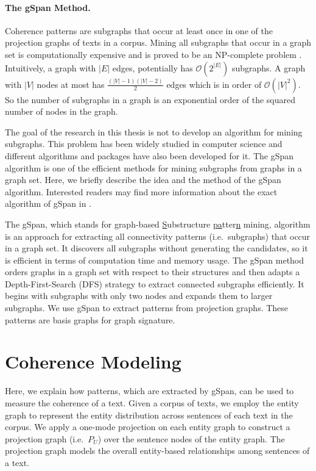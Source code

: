 \paragraph{The gSpan Method.}
%
Coherence patterns are subgraphs that occur at least once in one of the projection graphs of texts in a corpus. 
Mining all subgraphs that occur in a graph set is computationally expensive and is proved to be an NP-complete problem \cite{althaus04}. 
Intuitively, a graph with $|E|$ edges, potentially has $\mathcal{O} \left( 2^{| E |} \right)$ subgraphs.  
A graph with $| V |$ nodes at most has  $\frac{(| V |-1)(| V |-2)}{2}$ edges which is in order of $\mathcal{O} \left( | V | ^2 \right)$. 
So the number of subgraphs in a graph is an exponential order of the squared number of nodes in the graph. 

The goal of the research in this thesis is not to develop an algorithm for mining subgraphs.  
This problem has been widely studied in computer science and different algorithms and packages have also been developed for it. 
The gSpan algorithm \cite{yanxifeng02} is one of the efficient methods for mining subgraphs from graphs in a graph set. 
Here, we briefly describe the idea and the method of the gSpan algorithm.  
Interested readers may find more information about the exact algorithm of gSpan in . 

The gSpan, which stands for \underline{g}raph-based \underline{S}ubstructure \underline{pa}tter\underline{n} mining, algorithm is an approach for extracting all connectivity patterns (i.e.\ subgraphs) that occur in a graph set. 
It discovers all subgraphs without generating the candidates, so
it is efficient in terms of computation time and memory usage. 
The gSpan method orders graphs in a graph set with respect to their structures and then adapts a Depth-First-Search (DFS)  strategy to extract connected subgraphs efficiently. 
It begins with subgraphs with only two nodes and expands them to larger subgraphs. 
We use gSpan to extract patterns from projection graphs. 
These patterns are basis graphs for graph signature. 

\section{Coherence Modeling}
\label{sec:coh-modeling}

Here, we explain how patterns, which are extracted by gSpan, can be used to measure the coherence of a text. 
Given a corpus of texts, we employ the entity graph to represent the entity distribution across sentences of each text in the corpus. 
We apply a one-mode projection on each entity graph to construct a projection graph (i.e.\ $P_U$) over the sentence nodes of the entity graph. 
The projection graph models the overall entity-based relationships among sentences of a text.  

